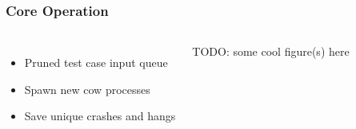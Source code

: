 \begin{frame}
\frametitle{Core Operation}

\begin{columns}[c]


\begin{itemize}
    \item Pruned test case input queue
    \item Spawn new cow processes
    \item Save unique crashes and hangs
\end{itemize}


TODO: some cool figure(s) here

\end{columns}
\end{frame}
